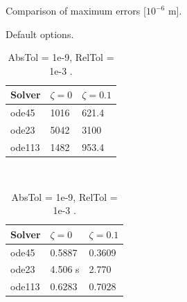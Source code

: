 \documentclass{article}
\begin{document}
	\begin{table}[h]
		\centering
		\def\arraystretch{1.1}
		\caption{Comparison of maximum errors [$10^{-6}$ m].}
		\begin{subtable}[t]{0.4\textwidth}
			\centering
			\caption{Default options.}
			\begin{tabular}{|l|l|l|}
				\hline
				Solver & $\zeta = 0$ & $\zeta = 0.1$\\
				\hline
				ode45  & 1016 & 621.4 \\
				ode23  & 5042 & 3100 \\
				ode113 & 1482 & 953.4 \\
				\hline
			\end{tabular}
		\end{subtable}
		~
		\begin{subtable}[t]{0.4\textwidth}
			\centering
			\caption{AbsTol = 1e-9, RelTol = 1e-3 .}
			\begin{tabular}{|l|l|l|}
				\hline
				Solver & $\zeta = 0$ & $\zeta = 0.1$\\
				\hline
				ode45  & 0.5887 & 0.3609 \\
				ode23  & 4.506 s & 2.770 \\
				ode113 & 0.6283 & 0.7028 \\
				\hline
			\end{tabular}
		\end{subtable}
		\label{tab:error_comparison}
	\end{table}
	
\end{document}
